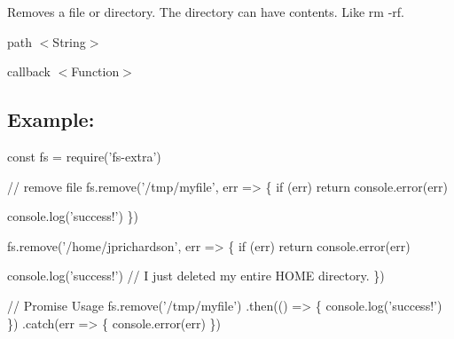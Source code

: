 Removes a file or directory. The directory can have contents. Like {\ttfamily rm -\/rf}.


\begin{DoxyItemize}
\item {\ttfamily path} {\ttfamily $<$String$>$}
\item {\ttfamily callback} {\ttfamily $<$Function$>$}
\end{DoxyItemize}

\subsection*{Example\+:}


\begin{DoxyCode}
const fs = require('fs-extra')

// remove file
fs.remove('/tmp/myfile', err => \{
  if (err) return console.error(err)

  console.log('success!')
\})

fs.remove('/home/jprichardson', err => \{
  if (err) return console.error(err)

  console.log('success!') // I just deleted my entire HOME directory.
\})

// Promise Usage
fs.remove('/tmp/myfile')
.then(() => \{
  console.log('success!')
\})
.catch(err => \{
  console.error(err)
\})
\end{DoxyCode}
 